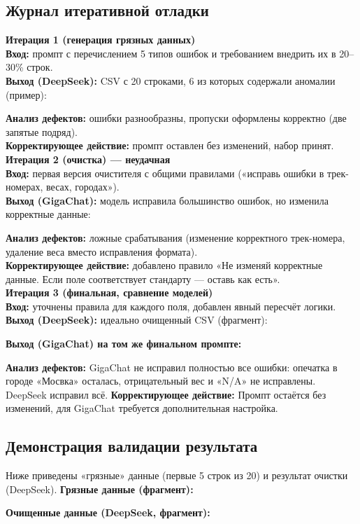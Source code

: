 \documentclass[oneside,a4paper,14pt]{extarticle} %
\begin{document}
\subsection{Журнал итеративной отладки}
\noindent
\textbf{Итерация 1 (генерация грязных данных)} \\
\noindent
\textbf{Вход:} промпт с перечислением 5 типов ошибок и требованием внедрить их в 20--30\% строк. \\
\noindent
\textbf{Выход (DeepSeek):} CSV с 20 строками, 6 из которых содержали аномалии (пример):

\noindent
\textbf{Анализ дефектов:} ошибки разнообразны, пропуски оформлены корректно (две запятые подряд). \\
\noindent
\textbf{Корректирующее действие:} промпт оставлен без изменений, набор принят.
\newpage
\noindent
\textbf{Итерация 2 (очистка) --- неудачная} \\
\noindent
\textbf{Вход:} первая версия очистителя с общими правилами («исправь ошибки в трек-номерах, весах, городах»). \\
\noindent
\textbf{Выход (GigaChat):} модель исправила большинство ошибок, но изменила корректные данные:

\noindent
\textbf{Анализ дефектов:} ложные срабатывания (изменение корректного трек-номера, удаление веса вместо исправления формата). \\
\noindent
\textbf{Корректирующее действие:} добавлено правило «Не изменяй корректные данные. Если поле соответствует стандарту --- оставь как есть». \\
\newline
\noindent
\textbf{Итерация 3 (финальная, сравнение моделей)} \\
\noindent
\textbf{Вход:} уточнены правила для каждого поля, добавлен явный пересчёт логики. \\
\noindent
\textbf{Выход (DeepSeek):} идеально очищенный CSV (фрагмент):

\newpage
\noindent
\textbf{Выход (GigaChat) на том же финальном промпте:}

\noindent
\textbf{Анализ дефектов:} GigaChat не исправил полностью все ошибки: опечатка в городе «Мосвка» осталась, отрицательный вес и «N/A» не исправлены. DeepSeek исправил всё.
\noindent
\textbf{Корректирующее действие:} Промпт остаётся без изменений, для GigaChat требуется дополнительная настройка.
\subsection{Демонстрация валидации результата}
\noindent
Ниже приведены «грязные» данные (первые 5 строк из 20) и результат очистки (DeepSeek).
\noindent
\textbf{Грязные данные (фрагмент):}

\noindent
\textbf{Очищенные данные (DeepSeek, фрагмент):}

\end{document}
